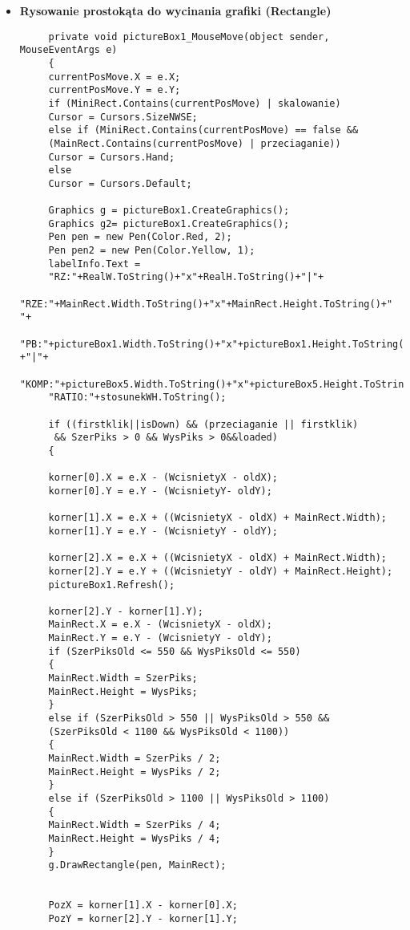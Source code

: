 \begin{itemize}
	\item \textbf{Rysowanie prostokąta do wycinania grafiki (Rectangle)}\\
\begin{lstlisting}
	 private void pictureBox1_MouseMove(object sender, MouseEventArgs e)
	 {
	 currentPosMove.X = e.X;
	 currentPosMove.Y = e.Y;
	 if (MiniRect.Contains(currentPosMove) | skalowanie)
	 Cursor = Cursors.SizeNWSE;
	 else if (MiniRect.Contains(currentPosMove) == false &&
	 (MainRect.Contains(currentPosMove) | przeciaganie))
	 Cursor = Cursors.Hand;
	 else
	 Cursor = Cursors.Default;
	 
	 Graphics g = pictureBox1.CreateGraphics();
	 Graphics g2= pictureBox1.CreateGraphics();
	 Pen pen = new Pen(Color.Red, 2);
	 Pen pen2 = new Pen(Color.Yellow, 1);
	 labelInfo.Text =
	 "RZ:"+RealW.ToString()+"x"+RealH.ToString()+"|"+
	 "RZE:"+MainRect.Width.ToString()+"x"+MainRect.Height.ToString()+" "+
	 "PB:"+pictureBox1.Width.ToString()+"x"+pictureBox1.Height.ToString() +"|"+
	 "KOMP:"+pictureBox5.Width.ToString()+"x"+pictureBox5.Height.ToString()+"|"+
	 "RATIO:"+stosunekWH.ToString();
	 
	 if ((firstklik||isDown) && (przeciaganie || firstklik)
	  && SzerPiks > 0 && WysPiks > 0&&loaded)
	 {
	 
	 korner[0].X = e.X - (WcisnietyX - oldX);
	 korner[0].Y = e.Y - (WcisnietyY- oldY);
	 
	 korner[1].X = e.X + ((WcisnietyX - oldX) + MainRect.Width);
	 korner[1].Y = e.Y - (WcisnietyY - oldY);
	 
	 korner[2].X = e.X + ((WcisnietyX - oldX) + MainRect.Width);
	 korner[2].Y = e.Y + ((WcisnietyY - oldY) + MainRect.Height);
	 pictureBox1.Refresh();

	 korner[2].Y - korner[1].Y);
	 MainRect.X = e.X - (WcisnietyX - oldX);
	 MainRect.Y = e.Y - (WcisnietyY - oldY);
	 if (SzerPiksOld <= 550 && WysPiksOld <= 550)                                                           
	 {
	 MainRect.Width = SzerPiks;
	 MainRect.Height = WysPiks;
	 }
	 else if (SzerPiksOld > 550 || WysPiksOld > 550 &&
	 (SzerPiksOld < 1100 && WysPiksOld < 1100))
	 {
	 MainRect.Width = SzerPiks / 2;
	 MainRect.Height = WysPiks / 2;
	 }
	 else if (SzerPiksOld > 1100 || WysPiksOld > 1100)
	 {
	 MainRect.Width = SzerPiks / 4;
	 MainRect.Height = WysPiks / 4;
	 }                                                                                              
	 g.DrawRectangle(pen, MainRect);
	 
	
	 PozX = korner[1].X - korner[0].X;
	 PozY = korner[2].Y - korner[1].Y;
	 

\end{lstlisting}
\end{itemize}
